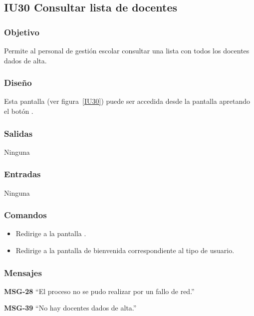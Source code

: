 
\subsection{IU30 Consultar lista de docentes}
\subsubsection{Objetivo}
   Permite al personal de gestión escolar consultar una lista con todos los docentes dados de alta.
\subsubsection{Diseño}
    Esta pantalla  (ver figura~\ref{IU30}) puede ser accedida desde la pantalla  apretando el botón .

\subsubsection{Salidas}
Ninguna
\subsubsection{Entradas}
Ninguna
\subsubsection{Comandos}
\begin{itemize}
    \item {} Redirige a la pantalla .
    \item {} Redirige a la pantalla de bienvenida correspondiente al tipo de usuario.
    
\end{itemize}

\subsubsection{Mensajes}

\begin{Citemize}
    \item {\bf MSG-28}  ``El proceso no se pudo realizar por un fallo de red.''
    \item {\bf MSG-39}  ``No hay docentes dados de alta.''
\end{Citemize}


